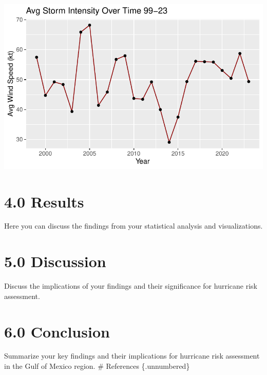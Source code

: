 \documentclass[12pt,letterpaper]{article}
\begin{document}
\includegraphics{GroupTask3_files/figure-pdf/Plots-4.pdf}

\newpage

\section{4.0 Results}\label{results}

Here you can discuss the findings from your statistical analysis and
visualizations.

\newpage

\section{5.0 Discussion}\label{discussion}

Discuss the implications of your findings and their significance for
hurricane risk assessment.

\newpage

\section{6.0 Conclusion}\label{conclusion}

Summarize your key findings and their implications for hurricane risk
assessment in the Gulf of Mexico region. \newpage \# References
\{.unnumbered\}

\printbibliography[heading=none]

\printbibliography[heading=bibintoc,title={References}]
\end{document}
